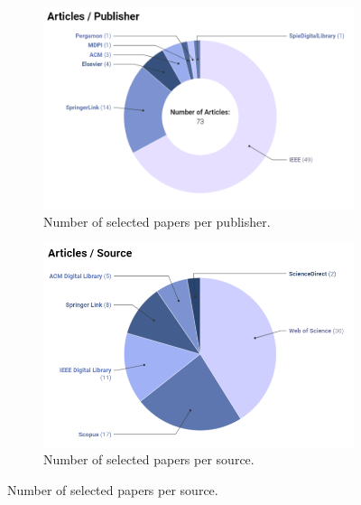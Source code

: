 \begin{figure}[H]    
    \caption{An Analysis of Paper Distribution Based on Source and Publisher.}
    \centring
    \begin{subfigure}[b]{0.45\textwidth}
    \caption{Number of selected papers per publisher.}
        \includegraphics[width=\textwidth]{images/articles_per_publisher_2.png}
    \end{subfigure}
    \begin{subfigure}[b]{0.45\textwidth}
    \caption{Number of selected papers per source.}
        \includegraphics[width=\textwidth]{images/articles_per_source_pie.png}
    \end{subfigure}
    \label{fig:archive-itemtype}
\end{figure}
 
